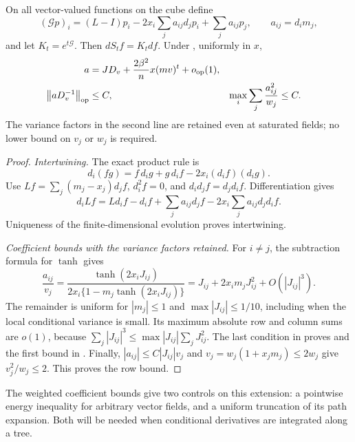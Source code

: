 \begin{proposition}
\label{prop:path-gradient}
On all vector-valued functions on the cube define
\begin{equation}
 (\mathscr Gp)_i=(L-I)p_i
       -2x_i\sum_j a_{ij}d_jp_i+\sum_j a_{ij}p_j,
 \qquad a_{ij}=d_i m_j,
 \label{eq:path-generator}
\end{equation}
and let $K_t=e^{t\mathscr G}$.  Then $dS_tf=K_tdf$.  Under
, uniformly in $x$,
\begin{align}
 a&=JD_v+\frac{2\beta^2}{n}x(mv)^t+o_{\mathrm{op}}(1),
 \label{eq:path-a-expansion}\\
 \left\lVert aD_v^{-1}\right\rVert_{\mathrm{op}}&\le C,
 &\max_i\sum_j\frac{a_{ij}^2}{w_j}&\le C.
 \label{eq:path-a-bounds}
\end{align}
The variance factors in the second line are retained even at saturated
fields; no lower bound on $v_j$ or $w_j$ is required.
\end{proposition}

\begin{proof}
\emph{Intertwining.}
The exact product rule is
\[
 d_i(fg)=f\,d_ig+g\,d_if-2x_i(d_if)(d_ig).
\]
Use $Lf=\sum_j(m_j-x_j)d_jf$, $d_i^2f=0$, and
$d_id_jf=d_jd_if$.  Differentiation gives
\[
 d_iLf=Ld_if-d_if+\sum_j a_{ij}d_jf
                         -2x_i\sum_j a_{ij}d_jd_if.
\]
Uniqueness of the finite-dimensional evolution proves intertwining.

\emph{Coefficient bounds with the variance factors retained.}
For $i\ne j$, the subtraction formula for $\tanh$ gives
\[
 \frac{a_{ij}}{v_j}
 =\frac{\tanh(2x_iJ_{ij})}
        {2x_i\{1-m_j\tanh(2x_iJ_{ij})\}}
 =J_{ij}+2x_i m_jJ_{ij}^2+O(|J_{ij}|^3).
\]
The remainder is uniform for $|m_j|\le1$ and
$\max|J_{ij}|\le1/10$, including when the local conditional variance
is small.  Its maximum absolute row and column sums
are $o(1)$, because
$\sum_j|J_{ij}|^3\le\max|J_{ij}|\sum_jJ_{ij}^2$.
The last condition in  proves
 and the first bound in
.  Finally,
$|a_{ij}|\le C|J_{ij}|v_j$ and
$v_j=w_j(1+x_jm_j)\le2w_j$ give
$v_j^2/w_j\le2$.  This proves the row bound.
\end{proof}

The weighted coefficient bounds give two controls on this extension:
a pointwise energy inequality for arbitrary vector fields, and a
uniform truncation of its path expansion.  Both will be needed when
conditional derivatives are integrated along a tree.

